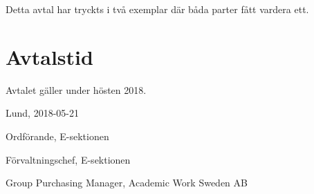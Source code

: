 \documentclass[10pt]{article}
\def\date{2018-05-21} %
\begin{document}
        Detta avtal har tryckts i två exemplar där båda parter fått vardera ett.
        
        \section{Avtalstid}
        Avtalet gäller under hösten 2018.

        \begin{signatures}{3}
            Lund, \date
            \signature{Daniel Bakic}{Ordförande, E-sektionen}
            \signature{Magnus Lundh}{Förvaltningschef, E-sektionen}
            \signature{Niklas Dennerholt}{Group Purchasing Manager, Academic Work Sweden AB}
        \end{signatures}
    
\end{document}
